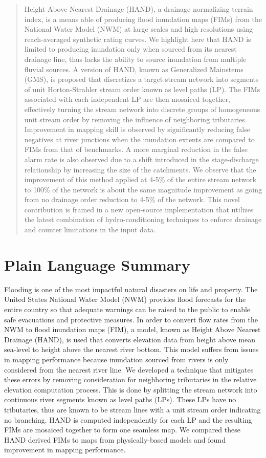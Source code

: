 \documentclass[draft]{dependencies/agujournal2019}
\begin{document}

\begin{abstract}
Height Above Nearest Drainage (HAND), a drainage normalizing terrain index, is a means able of producing flood inundation maps (FIMs) from the National Water Model (NWM) at large scales and high resolutions using reach-averaged synthetic rating curves. 
We highlight here that HAND is limited to producing inundation only when sourced from its nearest drainage line, thus lacks the ability to source inundation from multiple fluvial sources.
A version of HAND, known as Generalized Mainstems (GMS), is proposed that discretizes a target stream network into segments of unit Horton-Strahler stream order known as level paths (LP).
The FIMs associated with each independent LP are then mosaiced together, effectively turning the stream network into discrete groups of homogeneous unit stream order by removing the influence of neighboring tributaries.
Improvement in mapping skill is observed by significantly reducing false negatives at river junctions when the inundation extents are compared to FIMs from that of benchmarks.
A more marginal reduction in the false alarm rate is also observed due to a shift introduced in the stage-discharge relationship by increasing the size of the catchments.
We observe that the improvement of this method applied at 4-5\% of the entire stream network to 100\% of the network is about the same magnitude improvement as going from no drainage order reduction to 4-5\% of the network.
This novel contribution is framed in a new open-source implementation that utilizes the latest combination of hydro-conditioning techniques to enforce drainage and counter limitations in the input data.
\end{abstract}
%
\section*{Plain Language Summary}
Flooding is one of the most impactful natural disasters on life and property.
The United States National Water Model (NWM) provides flood forecasts for the entire country so that adequate warnings can be raised to the public to enable safe evacuations and protective measures.
In order to convert flow rates from the NWM to flood inundation maps (FIM), a model, known as Height Above Nearest Drainage (HAND), is used that converts elevation data from height above mean sea-level to height above the nearest river bottom.
This model suffers from issues in mapping performance because inundation sourced from rivers is only considered from the nearest river line.
We developed a technique that mitigates these errors by removing consideration for neighboring tributaries in the relative elevation computation process.
This is done by splitting the stream network into continuous river segments known as level paths (LPs).
These LPs have no tributaries, thus are known to be stream lines with a unit stream order indicating no branching.
HAND is computed independently for each LP and the resulting FIMs are mosaiced together to form one seamless map.
We compared these HAND derived FIMs to maps from physically-based models and found improvement in mapping performance.
%
 
\end{document}
